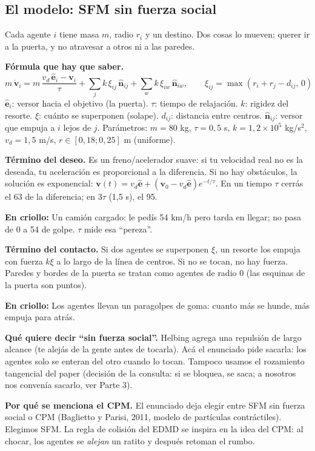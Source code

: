 \documentclass[10.5pt,a4paper]{article}
\newcommand{\pc}{\char37\xspace}
\newcommand{\tn}[2]{\ensuremath{#1\times10^{#2}}}
\newcommand{\vect}[1]{\mathbf{#1}}
\newcommand{\analogia}[1]{\par\colorbox{ana}{\parbox{\dimexpr\linewidth-2\fboxsep}{\textbf{En criollo:} #1}}\par}
\newcommand{\formula}[1]{\par\colorbox{fml}{\parbox{\dimexpr\linewidth-2\fboxsep}{\textbf{Fórmula que hay que saber.} #1}}\par}
\begin{document}
\subsection{El modelo: SFM sin fuerza social}
Cada agente $i$ tiene masa $m$, radio $r_i$ y un destino. Dos cosas lo mueven: querer ir a la puerta, y no atravesar a otros ni a las paredes.
\formula{
\[
m\,\dot{\vect v}_i = m\,\frac{v_d\,\hat{\vect e}_i-\vect v_i}{\tau}
+ \sum_{j}k\,\xi_{ij}\,\hat{\vect n}_{ij} + \sum_{w}k\,\xi_{iw}\,\hat{\vect n}_{iw},
\qquad \xi_{ij}=\max(r_i+r_j-d_{ij},\,0)
\]
$\hat{\vect e}_i$: versor hacia el objetivo (la puerta). $\tau$: tiempo de relajación. $k$: rigidez del resorte. $\xi$: cuánto se superponen (solape). $d_{ij}$: distancia entre centros. $\hat{\vect n}_{ij}$: versor que empuja a $i$ lejos de $j$.
Parámetros: $m=80$ kg, $\tau=0{,}5$ s, $k=\tn{1{,}2}{5}$ kg/s$^2$, $v_d=1{,}5$ m/s, $r\in[0{,}18;0{,}25]$ m (uniforme).}

\textbf{Término del deseo.} Es un freno/acelerador suave: si tu velocidad real no es la deseada, tu aceleración es proporcional a la diferencia. Si no hay obstáculos, la solución es exponencial: $\vect v(t)=v_d\hat{\vect e}+(\vect v_0-v_d\hat{\vect e})e^{-t/\tau}$. En un tiempo $\tau$ cerrás el 63\pc{} de la diferencia; en $3\tau$ (1,5 s), el 95\pc.
\analogia{Un camión cargado: le pedís 54 km/h pero tarda en llegar; no pasa de 0 a 54 de golpe. $\tau$ mide esa ``pereza''.}

\textbf{Término del contacto.} Si dos agentes se superponen $\xi$, un resorte los empuja con fuerza $k\xi$ a lo largo de la línea de centros. Si no se tocan, no hay fuerza. Paredes y bordes de la puerta se tratan como agentes de radio 0 (las esquinas de la puerta son puntos).
\analogia{Los agentes llevan un paragolpes de goma: cuanto más se hunde, más empuja para atrás.}

\textbf{Qué quiere decir ``sin fuerza social''.} Helbing agrega una repulsión de largo alcance (te alejás de la gente antes de tocarla). Acá el enunciado pide sacarla: los agentes solo se enteran del otro cuando lo tocan. Tampoco usamos el rozamiento tangencial del paper (decisión de la consulta: si se bloquea, se saca; a nosotros nos convenía sacarlo, ver Parte 3).

\textbf{Por qué se menciona el CPM.} El enunciado deja elegir entre SFM sin fuerza social o CPM (Baglietto y Parisi, 2011, modelo de partículas contráctiles). Elegimos SFM. La regla de colisión del EDMD se inspira en la idea del CPM: al chocar, los agentes se \emph{alejan} un ratito y después retoman el rumbo.
\end{document}
